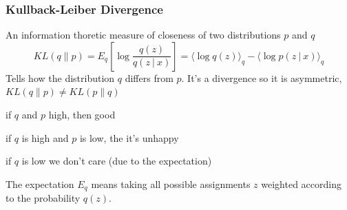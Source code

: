 \documentclass[10pt]{report}
\begin{document}
\subsubsection{Kullback-Leiber Divergence}
An information thoretic measure of closeness of two distributions $p$ and $q$ $$KL(q\|p) = E_q\left[\log\frac{q(z)}{q(z\:|\:x)}\right] = \langle\log q(z)\rangle_q - \langle\log p(z\:|\:x)\rangle_q$$
Tells how the distribution $q$ differs from $p$. It's a divergence so it is asymmetric, $KL(q\|p) \neq KL(p\|q)$\begin{list}{}{}
	\item if $q$ and $p$ high, then good
	\item if $q$ is high and $p$ is low, the it's unhappy
	\item if $q$ is low we don't care (due to the expectation)
\end{list}
The expectation $E_q$ means taking all possible assignments $z$ weighted according to the probability $q(z)$.
\end{document}
